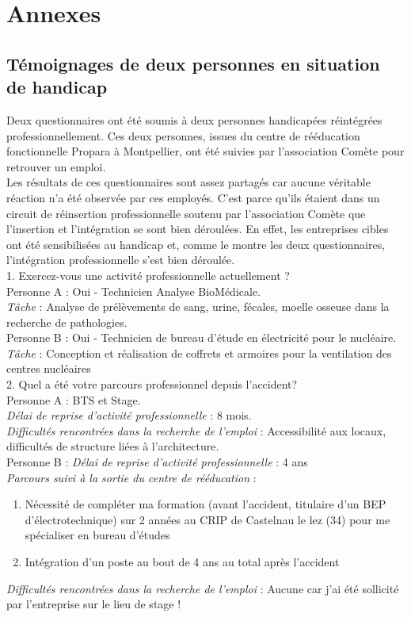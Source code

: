 \chapter{Annexes}

\section{Témoignages de deux personnes en situation de handicap}
\label{temoignages}
Deux questionnaires ont été soumis à deux personnes handicapées réintégrées professionnellement. Ces deux personnes, issues du centre de rééducation fonctionnelle Propara à Montpellier, ont été suivies par l'association Comète pour retrouver un emploi.\\

Les résultats de ces questionnaires sont assez partagés car aucune véritable réaction n'a été observée par ces employés. C'est parce qu'ils étaient dans un circuit de réinsertion professionnelle soutenu par l'association Comète que l'insertion et l'intégration se sont bien déroulées. En effet, les entreprises cibles ont été sensibilisées au handicap et, comme le montre les deux questionnaires, l'intégration professionnelle s'est bien déroulée. \\

1. Exercez-vous une activité professionnelle actuellement ?\\
Personne A : Oui - Technicien Analyse BioMédicale.\\
\textit{Tâche} : Analyse de prélèvements de sang, urine, fécales, moelle osseuse dans la recherche de pathologies.\\
Personne B : Oui - Technicien de bureau d'étude en électricité pour le nucléaire.\\ \textit{Tâche} : Conception et réalisation de coffrets et armoires pour la ventilation des centres nucléaires \\


2. Quel a été votre parcours professionnel depuis l’accident?\\
Personne A : BTS et Stage. \\
\textit{Délai de reprise d'activité professionnelle} : 8 mois.\\
\textit{Difficultés rencontrées dans la recherche de l'emploi} : Accessibilité aux locaux, difficultés de structure liées à l'architecture.\\
Personne B : \textit{Délai de reprise d'activité professionnelle} : 4 ans \\ 
\textit{Parcours suivi à la sortie du centre de rééducation} : 
\begin{enumerate}
\item Nécessité de compléter ma formation (avant l’accident, titulaire d’un BEP d’électrotechnique) sur 2 années au CRIP de Castelnau le lez (34) pour me spécialiser en bureau d’études
\item Intégration d’un poste au bout de 4 ans au total après l’accident\\
\end{enumerate}
\textit{Difficultés rencontrées dans la recherche de l'emploi} : Aucune car j'ai été sollicité par l'entreprise sur le lieu de stage ! \\


